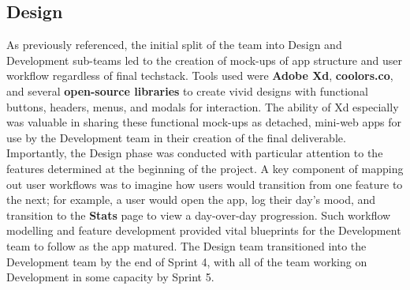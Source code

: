 \documentclass[10pt,american english]{article}
\begin{document}
\subsection*{Design}
As previously referenced, the initial split of the team into Design and Development sub-teams led to the creation of mock-ups of app structure and user workflow regardless of final techstack. Tools used were \textbf{Adobe Xd}, \textbf{coolors.co}, and several \textbf{open-source libraries} to create vivid designs with functional buttons, headers, menus, and modals for interaction. The ability of Xd especially was valuable in sharing these functional mock-ups as detached, mini-web apps for use by the Development team in their creation of the final deliverable. Importantly, the Design phase was conducted with particular attention to the features determined at the beginning of the project. A key component of mapping out user workflows was to imagine how users would transition from one feature to the next; for example, a user would open the app, log their day's mood, and transition to the \textbf{Stats} page to view a day-over-day progression. Such workflow modelling and feature development provided vital blueprints for the Development team to follow as the app matured. The Design team transitioned into the Development team by the end of Sprint 4, with all of the team working on Development in some capacity by Sprint 5.
\end{document}

